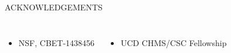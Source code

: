 \documentclass[compress,9pt,xcolor=svgnames]{beamer}
\begin{document}
{\begin{itemize}
    \end{itemize}

    \begin{block}
        {\begin{center}
            ACKNOWLEDGEMENTS
        \end{center}}
        \vskip -2mm
        \begin{columns}
    	\begin{itemize}
            \item NSF, CBET-1438456
        \end{itemize}
        \begin{itemize}
            \item UCD CHMS/CSC Fellowship
        \end{itemize}
	\end{columns}
    \end{block}
}
\end{document}
